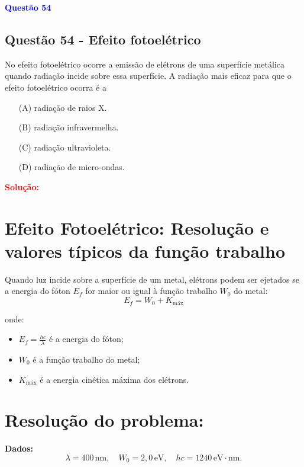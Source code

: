 \begin{flushleft}
\textbf{\textcolor{blue}{\Large Quest\~ao 54}}\\
\noindent
\subsection{Quest\~ao 54 - Efeito fotoelétrico}
No efeito fotoelétrico ocorre a emissão de elétrons de uma
superfície metálica quando radiação incide sobre essa
superfície. A radiação mais eficaz para que o efeito
fotoelétrico ocorra é a

\begin{itemize}
\item[(A)] radiação de raios X.
\item[(B)] radiação infravermelha.
\item[(C)] radiação ultravioleta.
\item[(D)] radiação de micro-ondas.
\end{itemize}

\vspace{0.5cm}

\textcolor{red}{\textbf{Solução:}}\\

\section*{Efeito Fotoelétrico: Resolução e valores típicos da função trabalho}

Quando luz incide sobre a superfície de um metal, elétrons podem ser ejetados se a energia do fóton \( E_f \) for maior ou igual à função trabalho \( W_0 \) do metal:
\[
E_f = W_0 + K_{\text{máx}}
\]

onde:
\begin{itemize}
    \item \( E_f = \frac{hc}{\lambda} \) é a energia do fóton;
    \item \( W_0 \) é a função trabalho do metal;
    \item \( K_{\text{máx}} \) é a energia cinética máxima dos elétrons.
\end{itemize}

\section*{Resolução do problema:}

\textbf{Dados:}
\[
\lambda = 400\,\mathrm{nm}, \quad W_0 = 2{,}0\,\mathrm{eV}, \quad hc = 1240\,\mathrm{eV\cdot nm}.
\]


\end{flushleft}
